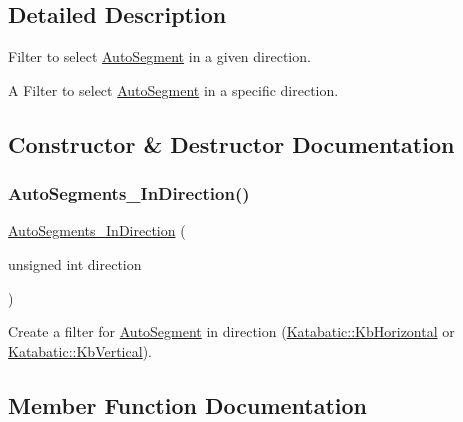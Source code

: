 \subsection{Detailed Description}
Filter to select \mbox{\hyperlink{classKatabatic_1_1AutoSegment}{Auto\+Segment}} in a given direction. 

A Filter to select \mbox{\hyperlink{classKatabatic_1_1AutoSegment}{Auto\+Segment}} in a specific direction. 

\subsection{Constructor \& Destructor Documentation}
\mbox{\label{classKatabatic_1_1AutoSegments__InDirection_ad51ecb756fa52e994c47dffcdb21c136}} 
\subsubsection{\texorpdfstring{Auto\+Segments\+\_\+\+In\+Direction()}{AutoSegments\_InDirection()}}
{\footnotesize\ttfamily \mbox{\hyperlink{classKatabatic_1_1AutoSegments__InDirection}{Auto\+Segments\+\_\+\+In\+Direction}} (\begin{DoxyParamCaption}\item[{unsigned int}]{direction }\end{DoxyParamCaption})\hspace{0.3cm}{\ttfamily [inline]}}

Create a filter for \mbox{\hyperlink{classKatabatic_1_1AutoSegment}{Auto\+Segment}} in {\ttfamily direction} (\mbox{\hyperlink{namespaceKatabatic_a2af2ad6b6441614038caf59d04b3b217a1a9045673c5d3c30b067100f1440ae1b}{Katabatic\+::\+Kb\+Horizontal}} or \mbox{\hyperlink{namespaceKatabatic_a2af2ad6b6441614038caf59d04b3b217a284cad95203a27172838b09e396e3590}{Katabatic\+::\+Kb\+Vertical}}). 

\subsection{Member Function Documentation}
\mbox{\label{classKatabatic_1_1AutoSegments__InDirection_a0a6021852a0c5681a7b53dce6b2b87a4}} 
